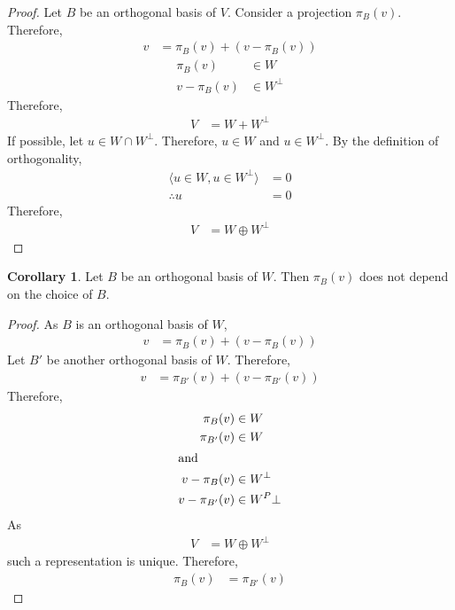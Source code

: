 \documentclass[fleqn, a4paper, 12pt]{article}
\theoremstyle{definition}
\theoremstyle{theorem}
\newtheorem{corollary}{Corollary}
\theoremstyle{remark}
\numberwithin{corollary}{theorem}
\numberwithin{equation}{theorem}
\begin{document}
\begin{proof}
	Let $B$ be an orthogonal basis of $V$. Consider a projection $\pi_B(v)$. Therefore,
	\begin{align*}
		v &= \pi_B(v) + \left( v - \pi_B(v) \right)
	\end{align*}
	\begin{align*}
		\pi_B(v) &\in W\\
		v - \pi_B(v) &\in W^{\perp}
	\end{align*}
	Therefore,
	\begin{align*}
		V &= W + W^{\perp}
	\end{align*}
	If possible, let $u \in W \cap W^{\perp}$. Therefore, $u \in W$ and $u \in W^{\perp}$. By the definition of orthogonality, 
	\begin{align*}
		\langle u \in W, u \in W^{\perp} \rangle &= 0\\
		\therefore u &= 0
	\end{align*}
	Therefore,
	\begin{align*}
		V &= W \oplus W^{\perp}
	\end{align*}
\end{proof}

\begin{corollary}
	Let $B$ be an orthogonal basis of $W$. Then $\pi_B(v)$ does not depend on the choice of $B$.
\end{corollary}

\begin{proof}
	As $B$ is an orthogonal basis of $W$,
	\begin{align*}
		v &= \pi_B(v) + \left( v - \pi_B(v) \right)
	\end{align*}
	Let $B'$ be another orthogonal basis of $W$. Therefore,
	\begin{align*}
		v &= \pi_{B'}(v) + \left( v - \pi_{B'}(v) \right)
	\end{align*}
	Therefore,
	\begin{align*}
		\pi_B(v) &\in W\\
		\pi_{B'}(v) &\in W\\
		\intertext{and}
		v - \pi_B(v) &\in W^{\perp}\\
		v - \pi_{B'}(v) &\in W^P{\perp}
	\end{align*}
	As
	\begin{align*}
		V &= W \oplus W^{\perp}
	\end{align*}
	such a representation is unique. Therefore, 
	\begin{align*}
		\pi_B(v) &= \pi_{B'}(v)
	\end{align*}
\end{proof}
\end{document}
